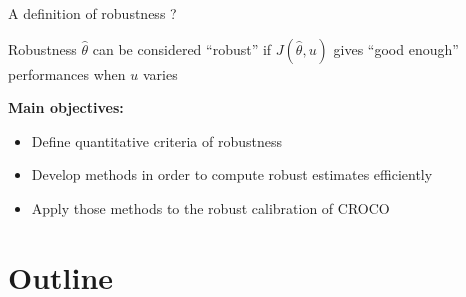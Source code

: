\documentclass[10pt,aspectratio=169,usepdftitle=false]{beamer}
\newcommand{\kk}{\theta}
\newcommand{\uu}{u}
\begin{document}
\begin{frame}{A definition of robustness ?}
  \begin{block}{Robustness}
    $\hat{\kk}$ can be considered ``robust'' if $J(\hat{\kk}, \uu)$
    gives ``good enough'' performances when $\uu$ varies
  \end{block}

  \textbf{Main objectives:}
  \begin{itemize}
  \item Define quantitative criteria of robustness
  \item Develop methods in order to compute robust estimates efficiently
  \item Apply those methods to the robust calibration of CROCO 
  \end{itemize}
\end{frame}


\AtBeginSection{
  \frame{
    \sectionpage
    \tableofcontents%
  }
}
\section*{Outline}
\AtBeginSection{
  \frame{
    \sectionpage
    \tableofcontents[currentsection,currentsubsection]%
  }
}
\end{document}
